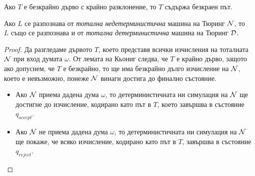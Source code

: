 \begin{prop}
  Ако $T$ е безкрайно дърво с крайно разклонение, то $T$ съдържа безкраен път.
\end{prop}

\begin{cor}
  Ако $L$ се разпознава от {\em тотална недетерминистична} машина на Тюринг $\mathcal{N}$, то $L$
  също се разпознава и от {\em тотална детерминистична} машина на Тюринг $\mathcal{D}$.
\end{cor}
\begin{proof}
  Да разгледаме дървото $T$, което представя всички изчисления на тоталната $\mathcal{N}$ при вход думата $\omega$.
  От лемата на Кьониг следва, че $T$ е крайно дърво, защото ако допуснем, че $T$ е безкрайно, то ще има безкрайно дълго изчисление на $\mathcal{N}$,
  което е невъзможно, понеже $\mathcal{N}$ винаги достига до финално състояние.
  \begin{itemize}
  \item 
    Ако $\mathcal{N}$ приема дадена дума $\omega$, то детерминистичната ни симулация на $\mathcal{N}$ ще достигне до изчисление, кодирано като път в $T$, 
    което завършва в състояние $q_{accept}$.
  \item
    Ако $\mathcal{N}$ не приема дадена дума $\omega$, то детерминистичната ни симулация на $\mathcal{N}$ ще покаже, че всяко изчисление, кодирано като път в $T$, завършва в състояние $q_{reject}$.
  \end{itemize}
\end{proof}

